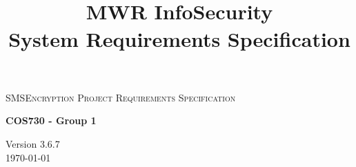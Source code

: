 \begin{titlepage}
\begin{center}

\textsc{\LARGE SMSEncryption Project Requirements Specification}

\textbf{COS730 - Group 1} \\

\title{
  \textbf{\\}
MWR InfoSecurity\\
System Requirements Specification\\
}

\vfill

{\large Version 3.6.7}
\\
{\large \today}

\end{center}
\end{titlepage}
